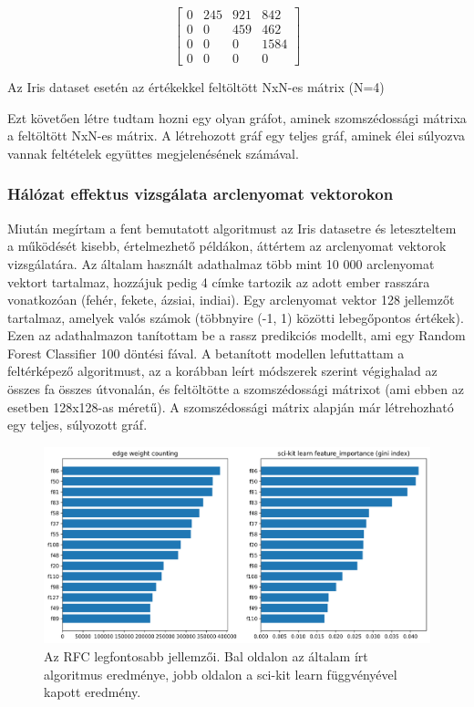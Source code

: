 \begin{table}
\[
\begin{bmatrix}
0 & 245 & 921 & 842\\
0 & 0 & 459 & 462\\
0 & 0 & 0 & 1584\\
0 & 0 & 0 & 0
\end{bmatrix}
\]
\caption{Az Iris dataset esetén az értékekkel feltöltött NxN-es mátrix (N=4)}
\label{tab:irisnxn}
\end{table}

Ezt követően létre tudtam hozni egy olyan gráfot, aminek szomszédossági mátrixa a feltöltött NxN-es mátrix. A létrehozott gráf egy teljes gráf, aminek élei súlyozva vannak feltételek együttes megjelenésének számával. 

\subsubsection*{Hálózat effektus vizsgálata arclenyomat vektorokon}

Miután megírtam a fent bemutatott algoritmust az Iris datasetre és leteszteltem a működését kisebb, értelmezhető példákon, áttértem az arclenyomat vektorok vizsgálatára. Az általam használt adathalmaz több mint 10 000 arclenyomat vektort tartalmaz, hozzájuk pedig 4 címke tartozik az adott ember rasszára vonatkozóan (fehér, fekete, ázsiai, indiai). Egy arclenyomat vektor 128 jellemzőt tartalmaz, amelyek valós számok (többnyire (-1, 1) közötti lebegőpontos értékek). Ezen az adathalmazon tanítottam be a rassz predikciós modellt, ami egy Random Forest Classifier 100 döntési fával. A betanított modellen lefuttattam a feltérképező algoritmust, az a korábban leírt módszerek szerint végighalad az összes fa összes útvonalán, és feltöltötte a szomszédossági mátrixot (ami ebben az esetben 128x128-as méretű). A szomszédossági mátrix alapján már létrehozható egy teljes, súlyozott gráf.

\begin{figure}[ht]
	\centering
	\includegraphics[width=0.95\columnwidth]{figures/network_top_feature.png}
	\caption{Az RFC legfontosabb jellemzői. Bal oldalon az általam írt algoritmus eredménye, jobb oldalon a sci-kit learn függvényével kapott eredmény.}
	\label{fig:myfimp}
\end{figure}

